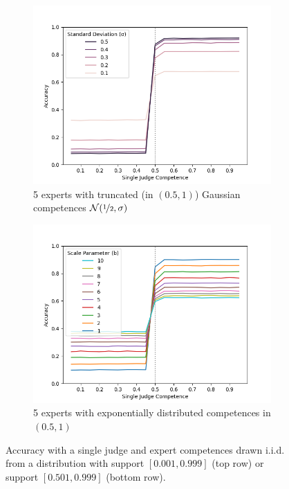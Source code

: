 \documentclass[letterpaper]{article} %
\begin{document}
\begin{figure}[t]
\hfill
\begin{subfigure}{0.3\textwidth}
 \includegraphics[width=\textwidth]{./Figures/Experiment1_Gaussian5/Experiment1_gaussian_5experts_(05,1)_Fig6_compare_stddevs.png}
 \caption{5 experts with truncated (in $(0.5,1)$) Gaussian competences $\mathcal{N}(\nicefrac{1}{2},\sigma)$}
\label{fig:E1_gaussian_05,1_stddevs}
\end{subfigure}
\hfill
\begin{subfigure}{0.3\textwidth}
 \includegraphics[width=\textwidth]{./Figures/Experiment1_Exponential/Lineplot_5experts_Experiment1_exponential[05,1]_experts_1judge_100000iter.png}
 \caption{5 experts with exponentially distributed competences in $(0.5,1)$}
 \label{fig:E1_exponential_05,1}
\end{subfigure}
\caption{Accuracy with a single judge and expert competences drawn i.i.d. from a distribution with support $[0.001, 0.999]$ (top row) or support $[0.501, 0.999]$ (bottom row).}
\label{fig:single_judge_(0,1)}
\end{figure}
\end{document}
